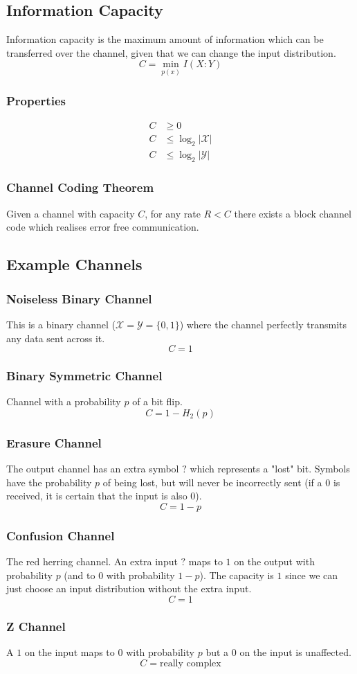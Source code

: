 \documentclass[a4paper,12pt,DIV=calc]{scrartcl}
\begin{document}
\subsection{Information Capacity}
Information capacity is the maximum amount of information which can be
transferred over the channel, given that we can change the input distribution.
\[C = \min_{p(x)} I(X:Y)\]

\subsubsection{Properties}
\begin{align*}
  C &\geq 0 \\
  C &\leq \log_2 |\mathcal{X}| \\
  C &\leq \log_2 |\mathcal{Y}|
\end{align*}

\subsubsection{Channel Coding Theorem}
Given a channel with capacity $C$, for any rate $R < C$ there exists a block
channel code which realises error free communication.

\subsection{Example Channels}
\subsubsection{Noiseless Binary Channel}
This is a binary channel ($\mathcal{X} = \mathcal{Y} = \{0, 1\}$) where the
channel perfectly transmits any data sent across it.
\[C = 1\]

\subsubsection{Binary Symmetric Channel}
Channel with a probability $p$ of a bit flip.
\[C = 1 - H_2(p)\]

\subsubsection{Erasure Channel}
The output channel has an extra symbol $?$ which represents a "lost" bit.
Symbols have the probability $p$ of being lost, but will never be incorrectly
sent (if a $0$ is received, it is certain that the input is also $0$).
\[C = 1 - p\]

\subsubsection{Confusion Channel}
The red herring channel. An extra input $?$ maps to $1$ on the output with
probability $p$ (and to $0$ with probability $1 - p$). The capacity is $1$ since
we can just choose an input distribution without the extra input.
\[C = 1\]

\subsubsection{Z Channel}
A $1$ on the input maps to $0$ with probability $p$ but a $0$ on the input is
unaffected.
\[C = \text{really complex}\]
\end{document}
